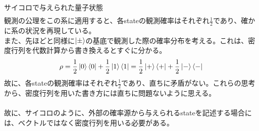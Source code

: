 \documentclass[a4paper,10.5pt]{article}
\numberwithin{equation}{section}
\begin{document}
\begin{examplebox}{サイコロで与えられた量子状態}
\begin{align*}
\end{align*}
観測の公理をこの系に適用すると、各stateの観測確率はそれぞれ$\frac{1}{2}$であり、確かに系の状況を再現している。\\
また、先ほどと同様に$\ket{\pm}$の基底で観測した際の確率分布を考える。これは、密度行列を代数計算から書き換えるとすぐに分かる。
\begin{align*}
\rho=\frac{1}{2}\ket{0}\bra{0}+\frac{1}{2}\ket{1}\bra{1}=\frac{1}{2}\ket{+}\bra{+}+\frac{1}{2}\ket{-}\bra{-}
\end{align*}
故に、各stateの観測確率はそれぞれ$\frac{1}{2}$であり、直ちに矛盾がない。これらの思考から、密度行列を用いた書き方には直ちに問題ないように思える。\\
\\
故に、サイコロのように、外部の確率源から与えられるstateを記述する場合には、ベクトルではなく密度行列を用いる必要がある。
\end{examplebox}
\end{document}

